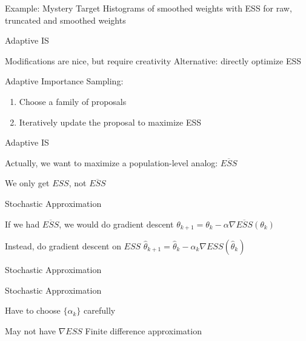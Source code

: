 \documentclass[14pt]{beamer}
\begin{document}
\begin{frame}{Example: Mystery Target}
    Histograms of smoothed weights with ESS for raw, truncated and smoothed weights
\end{frame}

\begin{frame}{Adaptive IS}
    \begin{outline}
        \1 Modifications are nice, but require creativity
        \1 Alternative: directly optimize ESS \newline

        \1 Adaptive Importance Sampling: 
            \2 \citep{Aky21} \newline
    \end{outline}

    \begin{enumerate}
        [default]
        \item Choose a family of proposals
        \item Iteratively update the proposal to maximize ESS
    \end{enumerate}
\end{frame}

\begin{frame}{Adaptive IS}
    \begin{outline}
        \1 Actually, we want to maximize a population-level analog: $\overline{ESS}$ \newline

        \1 We only get $ESS$, not $\overline{ESS}$
    \end{outline}
\end{frame}

\begin{frame}{Stochastic Approximation}
    \begin{outline}
        \1 If we had $\overline{ESS}$, we would do gradient descent
        \1 $\theta_{k+1} = \theta_k - \alpha \nabla \overline{ESS}(\theta_k)$ \newline

        \1 Instead, do gradient descent on $ESS$
        \1 $\hat{\theta}_{k+1} = \hat{\theta}_k - \alpha_k \nabla ESS(\hat{\theta}_k)$ \newline

        \1 Stochastic Approximation
            \2 \citep{Rob51}
    \end{outline}
\end{frame}

\begin{frame}{Stochastic Approximation}
    \begin{outline}
        \1 Have to choose $\{ \alpha_k \}$ carefully \newline

        \1 May not have $\nabla ESS$
            \2 Finite difference approximation
            \2 \citep{Kie52} \newline
    \end{outline}
\end{frame}
\end{document}
